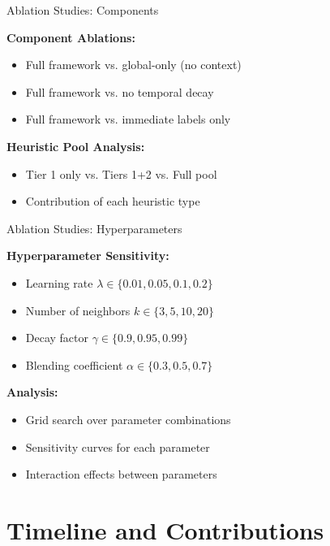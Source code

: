 \documentclass[10pt,xcolor={table,dvipsnames},t]{beamer}
\begin{document}
\begin{frame}{Ablation Studies: Components}

\textbf{Component Ablations:}
\begin{itemize}
  \item Full framework vs. global-only (no context)
  \item Full framework vs. no temporal decay
  \item Full framework vs. immediate labels only
\end{itemize}

\vspace{0.5em}
\textbf{Heuristic Pool Analysis:}
\begin{itemize}
  \item Tier 1 only vs. Tiers 1+2 vs. Full pool
  \item Contribution of each heuristic type
\end{itemize}

\end{frame}

\begin{frame}{Ablation Studies: Hyperparameters}

\textbf{Hyperparameter Sensitivity:}
\begin{itemize}
  \item Learning rate $\lambda \in \{0.01, 0.05, 0.1, 0.2\}$
  \item Number of neighbors $k \in \{3, 5, 10, 20\}$
  \item Decay factor $\gamma \in \{0.9, 0.95, 0.99\}$
  \item Blending coefficient $\alpha \in \{0.3, 0.5, 0.7\}$
\end{itemize}

\vspace{0.5em}
\textbf{Analysis:}
\begin{itemize}
  \item Grid search over parameter combinations
  \item Sensitivity curves for each parameter
  \item Interaction effects between parameters
\end{itemize}

\end{frame}

\section{Timeline and Contributions}
\end{document}
